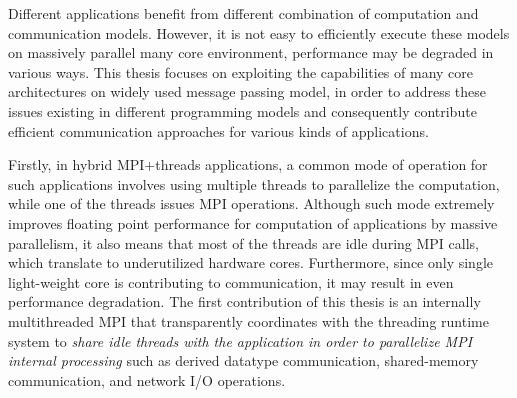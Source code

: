 Different applications benefit from different combination of computation and
communication models. However, it is not easy to efficiently execute these models
on massively parallel many core environment, performance may be degraded in various
ways. This thesis focuses on exploiting the capabilities of many core architectures
on widely used message passing model, in order to address these issues existing
in different programming models and consequently contribute efficient communication
approaches for various kinds of applications.

Firstly, in hybrid MPI+threads applications, a common mode of operation for such
applications involves using multiple threads to parallelize the computation,
while one of the threads issues MPI operations. Although such mode extremely
improves floating point performance for computation of applications by massive
parallelism, it also means that most of the threads are idle during MPI calls,
which translate to underutilized hardware cores. Furthermore, since only single
light-weight core is contributing to communication, it may result in even
performance degradation. The first contribution of this thesis is an internally multithreaded
MPI that transparently coordinates with the threading runtime system to \emph{share
idle threads with the application in order to parallelize MPI internal
processing} such as derived datatype communication, shared-memory communication,
and network I/O operations.

